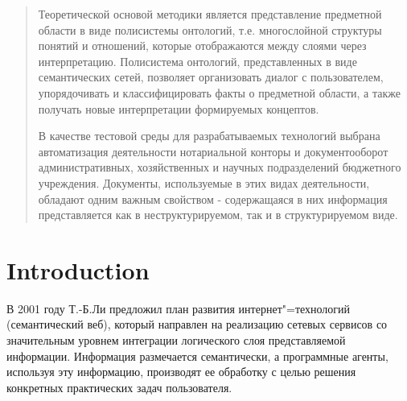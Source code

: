 \documentclass[conference]{IEEEtran}
\begin{document}
{{\begin{abstract}
Теоретической основой методики является представление предметной области в виде полисистемы онтологий, т.е. многослойной структуры понятий и отношений, которые отображаются между слоями через интерпретацию. Полисистема онтологий, представленных в виде семантических сетей, позволяет организовать диалог с пользователем, упорядочивать и классифицировать факты о предметной области, а также получать новые интерпретации формируемых концептов.

В качестве тестовой среды для разрабатываемых технологий выбрана автоматизация деятельности нотариальной конторы и документооборот административных, хозяйственных и научных подразделений бюджетного учреждения. Документы, используемые в этих видах деятельности, обладают одним важным свойством - содержащаяся в них информация представляется как в неструктурируемом, так и в структурируемом виде.

\end{abstract}





%
\IEEEpeerreviewmaketitle



\section{Introduction}

В 2001 году Т.-Б.Ли предложил план развития интернет"=технологий (семантический веб), который направлен на реализацию сетевых сервисов со значительным уровнем интеграции логического слоя представляемой информации. Информация размечается семантически, а программные агенты, используя эту информацию, производят ее обработку с целью решения конкретных практических задач пользователя.

}}
\end{document}
